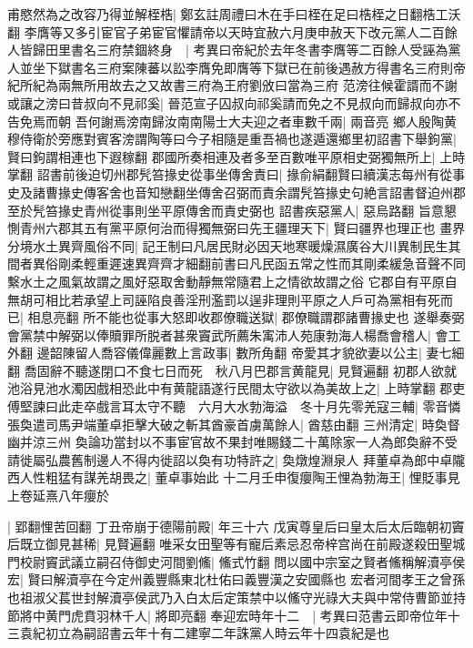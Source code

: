 甫愍然為之改容乃得並解桎梏|{
	鄭玄註周禮曰木在手曰桎在足曰梏桎之日翻梏工沃翻}
李膺等又多引宦官子弟宦官懼請帝以天時宜赦六月庚申赦天下改元黨人二百餘人皆歸田里書名三府禁錮終身　|{
	考異曰帝紀於去年冬書李膺等二百餘人受誣為黨人並坐下獄書名三府案陳蕃以訟李膺免即膺等下獄已在前後遇赦方得書名三府則帝紀所紀為兩無所用故去之又故書三府為王府劉攽曰當為三府}
范滂往候霍諝而不謝或讓之滂曰昔叔向不見祁奚|{
	晉范宣子囚叔向祁奚請而免之不見叔向而歸叔向亦不告免焉而朝}
吾何謝焉滂南歸汝南南陽士大夫迎之者車數千兩|{
	兩音亮}
鄉人殷陶黄穆侍衛於旁應對賓客滂謂陶等曰今子相隨是重吾禍也遂遁還鄉里初詔書下舉鉤黨|{
	賢曰鉤謂相連也下遐稼翻}
郡國所奏相連及者多至百數唯平原相史弼獨無所上|{
	上時掌翻}
詔書前後迫切州郡髠笞掾史從事坐傳舍責曰|{
	掾俞絹翻賢曰續漢志每州有從事史及諸曹掾史傳客舍也音知戀翻坐傳舍召弼而責余謂髠笞掾史句絶言詔書督迫州郡至於髠笞掾史青州從事則坐平原傳舍而責史弼也}
詔書疾惡黨人|{
	惡烏路翻}
旨意懇惻青州六郡其五有黨平原何治而得獨無弼曰先王疆理天下|{
	賢曰疆界也理正也}
畫界分境水土異齊風俗不同|{
	記王制曰凡居民財必因天地寒暖燥濕廣谷大川異制民生其間者異俗剛柔輕重遲速異齊齊才細翻前書曰凡民函五常之性而其剛柔緩急音聲不同繫水土之風氣故謂之風好惡取舍動靜無常隨君上之情欲故謂之俗}
它郡自有平原自無胡可相比若承望上司誣陷良善淫刑濫罰以逞非理則平原之人戶可為黨相有死而已|{
	相息亮翻}
所不能也從事大怒即收郡僚職送獄|{
	郡僚職謂郡諸曹掾史也}
遂舉奏弼會黨禁中解弼以俸贖罪所脱者甚衆竇武所薦朱㝢沛人苑康勃海人楊喬會稽人|{
	會工外翻}
邊韶陳留人喬容儀偉麗數上言政事|{
	數所角翻}
帝愛其才貌欲妻以公主|{
	妻七細翻}
喬固辭不聽遂閉口不食七日而死　秋八月巴郡言黄龍見|{
	見賢遍翻}
初郡人欲就池浴見池水濁因戲相恐此中有黄龍語遂行民間太守欲以為美故上之|{
	上時掌翻}
郡吏傅堅諫曰此走卒戲言耳太守不聽　六月大水勃海溢　冬十月先零羌寇三輔|{
	零音憐}
張奐遣司馬尹端董卓拒擊大破之斬其酋豪首虜萬餘人|{
	酋慈由翻}
三州清定|{
	時奐督幽并涼三州}
奐論功當封以不事宦官故不果封唯賜錢二十萬除家一人為郎奐辭不受請徙屬弘農舊制邊人不得内徙詔以奐有功特許之|{
	奐燉煌淵泉人}
拜董卓為郎中卓隴西人性粗猛有謀羌胡畏之|{
	董卓事始此}
十二月壬申復癭陶王悝為勃海王|{
	悝貶事見上卷延熹八年癭於}


|{
	郢翻悝苦回翻}
丁丑帝崩于德陽前殿|{
	年三十六}
戊寅尊皇后曰皇太后太后臨朝初竇后既立御見甚稀|{
	見賢遍翻}
唯采女田聖等有寵后素忌忍帝梓宫尚在前殿遂殺田聖城門校尉竇武議立嗣召侍御史河間劉鯈|{
	鯈式竹翻}
問以國中宗室之賢者鯈稱解瀆亭侯宏|{
	賢曰解瀆亭在今定州義豐縣東北杜佑曰義豐漢之安國縣也}
宏者河間孝王之曾孫也祖淑父萇世封解瀆亭侯武乃入白太后定策禁中以鯈守光祿大夫與中常侍曹節並持節將中黄門虎賁羽林千人|{
	將即亮翻}
奉迎宏時年十二　|{
	考異曰范書云即帝位年十三袁紀初立為嗣詔書云年十有二建寧二年誅黨人時云年十四袁紀是也}



